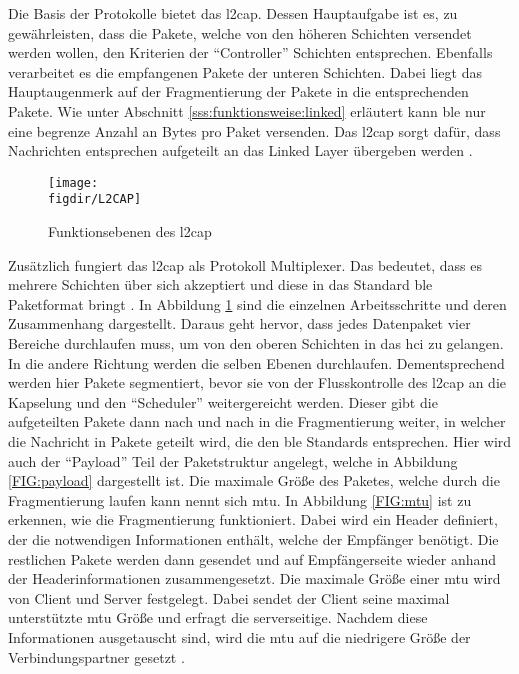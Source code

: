 \noindent Die Basis der Protokolle bietet das \ac{l2cap}. Dessen Hauptaufgabe ist es, zu gewährleisten, dass die Pakete, welche von den höheren Schichten versendet werden wollen, den Kriterien der "`Controller"' Schichten entsprechen. Ebenfalls verarbeitet es die empfangenen Pakete der unteren Schichten. Dabei liegt das Hauptaugenmerk auf der Fragmentierung der Pakete in die entsprechenden Pakete. Wie unter Abschnitt \ref{sss:funktionsweise:linked} erläutert kann \ac{ble} nur eine begrenze Anzahl an Bytes pro Paket versenden. Das \ac{l2cap} sorgt dafür, dass Nachrichten entsprechen aufgeteilt an das Linked Layer übergeben werden \cite{TI:WWW}.\\

\begin{figure}[h]
	\centering
	\texttt{[image: \\figdir/L2CAP]}
	\caption{Funktionsebenen des \ac{l2cap} \cite{TI:WWW}}
	\label{FIG:l2cap}
\end{figure}

\noindent Zusätzlich fungiert das \ac{l2cap} als Protokoll Multiplexer. Das bedeutet, dass es mehrere Schichten über sich akzeptiert und diese in das Standard \ac{ble} Paketformat bringt \cite[Seite 25]{Townsend14:GSB}. In Abbildung \ref{FIG:l2cap} sind die einzelnen Arbeitsschritte und deren Zusammenhang dargestellt. Daraus geht hervor, dass jedes Datenpaket vier Bereiche durchlaufen muss, um von den oberen Schichten in das \ac{hci} zu gelangen. In die andere Richtung werden die selben Ebenen durchlaufen. Dementsprechend werden hier Pakete segmentiert, bevor sie von der Flusskontrolle des \ac{l2cap} an die Kapselung und den "`Scheduler"' weitergereicht werden. Dieser gibt die aufgeteilten Pakete dann nach und nach in die Fragmentierung weiter, in welcher die Nachricht in Pakete geteilt wird, die den \ac{ble} Standards entsprechen. Hier wird auch der "`Payload"' Teil der Paketstruktur angelegt, welche in Abbildung \ref{FIG:payload} dargestellt ist. Die maximale Größe des Paketes, welche durch die Fragmentierung laufen kann nennt sich \ac{mtu}. In Abbildung \ref{FIG:mtu} ist zu erkennen, wie die Fragmentierung funktioniert. Dabei wird ein Header definiert, der die notwendigen Informationen enthält, welche der Empfänger benötigt. Die restlichen Pakete werden dann gesendet und auf Empfängerseite wieder anhand der Headerinformationen zusammengesetzt. Die maximale Größe einer \ac{mtu} wird von Client und Server festgelegt. Dabei sendet der Client seine maximal unterstützte \ac{mtu} Größe und erfragt die serverseitige. Nachdem diese Informationen ausgetauscht sind, wird die \ac{mtu} auf die niedrigere Größe der Verbindungspartner gesetzt \cite{TI:WWW}.\\ 

